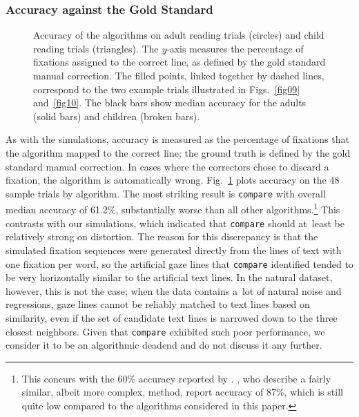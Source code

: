 \documentclass[doc,biblatex]{apa7}
\begin{document}
\subsubsection{Accuracy against the Gold Standard}

	\begin{figure}
	\vspace*{2pt}
	\caption{Accuracy of the algorithms on adult reading trials (circles) and child reading trials (triangles). The \textit{y}-axis measures the percentage of fixations assigned to the correct line, as defined by the gold standard manual correction. The filled points, linked together by dashed lines, correspond to the two example trials illustrated in Figs.~\ref{fig09} and~\ref{fig10}. The black bars show median accuracy for the adults (solid bars) and children (broken bars).}
	\label{fig08}
	\end{figure}

As with the simulations, accuracy is measured as the percentage of fixations that the algorithm mapped to the correct line; the ground truth is defined by the gold standard manual correction. In cases where the correctors chose to discard a fixation, the algorithm is automatically wrong. Fig.~\ref{fig08} plots accuracy on the 48 sample trials by algorithm. The most striking result is \texttt{compare} with overall median accuracy of 61.2\%, substantially worse than all other algorithms.\footnote{This concurs with the 60\% accuracy reported by \textcite[p.~1231]{LimaSanches:2015}. \textcite[p.~104]{Yamaya:2017}, who describe a fairly similar, albeit more complex, method, report accuracy of 87\%, which is still quite low compared to the algorithms considered in this paper.} This contrasts with our simulations, which indicated that \texttt{compare} should at~least be relatively strong on distortion. The reason for this discrepancy is that the simulated fixation sequences were generated directly from the lines of text with one fixation per word, so the artificial gaze lines that \texttt{compare} identified tended to be very horizontally similar to the artificial text lines. In the natural dataset, however, this is not the case; when the data contains a~lot of natural noise and regressions, gaze lines cannot be reliably matched to text lines based on similarity, even if the set of candidate text lines is narrowed down to the three closest neighbors. Given that \texttt{compare} exhibited such poor performance, we consider it to be an algorithmic deadend and do not discuss it any further.
\end{document}
